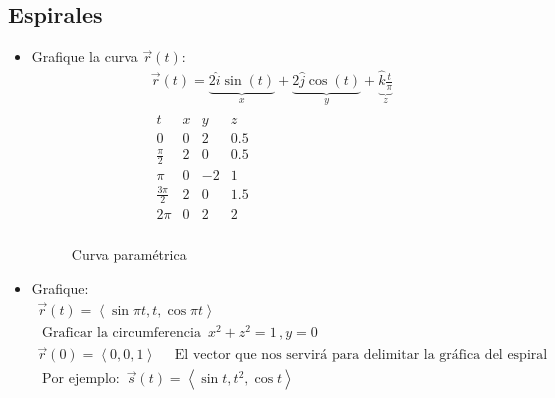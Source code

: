 \documentclass{article}
\begin{document}
\subsection{Espirales}
\begin{itemize}
    \item Grafique la curva $\vec{r}(t)$:
        \begin{align*}
            \vec{r}(t) = \underbrace{2 \hat{i} \sin (t)}_{x} + \underbrace{2 \hat{j} \cos (t) 
            }_{y} + \underbrace{\hat{k} \frac{t}{\pi}}_{z} \\ 
            \begin{matrix}
                t & x & y & z \\ 
                0 & 0 & 2 & 0.5 \\ 
                \frac{\pi}{2} & 2&  0&  0.5 \\ 
                \pi & 0 & -2&  1 \\ 
                \frac{3\pi}{2} & 2 &  0 & 1.5 \\   
                2\pi &  0 & 2 & 2 \\ 
            \end{matrix} 
        \end{align*}
        \begin{figure}[htbp]
            \centering
            \caption{Curva paramétrica}
            \label{}
        \end{figure}
    
    \item Grafique:
        \begin{align*}
            \vec{r}(t) = \left\langle \sin \pi t , t ,\cos \pi t \right\rangle \\ 
            \text{  Graficar la circumferencia  } \, x^2+z^2= 1\, , y = 0 \\ 
            \vec{r}(0) = \left\langle 0,0,1 \right\rangle \quad \text{  El vector que nos servirá para delimitar la gráfica del espiral  } \\
            \text{  Por ejemplo:   } \, \vec{s}(t) = \left\langle \sin t, t^2 , \cos t \right\rangle \\    
        \end{align*}
\end{itemize}
\end{document}
